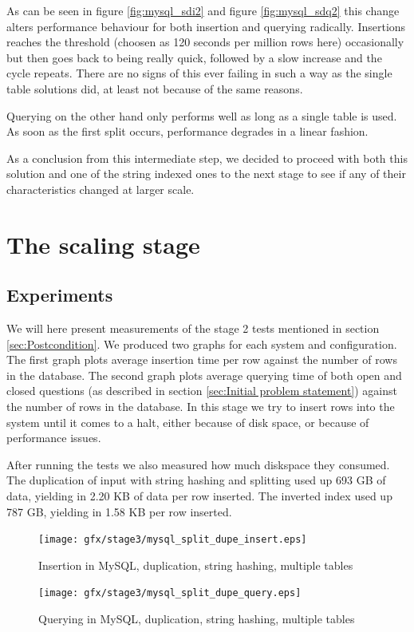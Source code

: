 As can be seen in figure \ref{fig:mysql_sdi2} and figure \ref{fig:mysql_sdq2} this change alters performance behaviour for both insertion and querying radically. Insertions reaches the threshold (choosen as 120 seconds per million rows here) occasionally but then goes back to being really quick, followed by a slow increase and the cycle repeats. There are no signs of this ever failing in such a way as the single table solutions did, at least not because of the same reasons.

Querying on the other hand only performs well as long as a single table is used. As soon as the first split occurs, performance degrades in a linear fashion.

As a conclusion from this intermediate step, we decided to proceed with both this solution and one of the string indexed ones to the next stage to see if any of their characteristics changed at larger scale.

\section{The scaling stage}
\subsection{Experiments} \label{subsec:Experiments3}
We will here present measurements of the stage 2 tests mentioned in section \ref{sec:Postcondition}. We produced two graphs for each system and configuration. The first graph plots average insertion time per row against the number of rows in the database. The second graph plots average querying time of both open and closed questions (as described in section \ref{sec:Initial problem statement}) against the number of rows in the database. In this stage we try to insert rows into the system until it comes to a halt, either because of disk space, or because of performance issues.

After running the tests we also measured how much diskspace they consumed. The duplication of input with string hashing and splitting used up 693 GB of data, yielding in 2.20 KB of data per row inserted. The inverted index used up 787 GB, yielding in 1.58 KB per row inserted.

\pagebreak

\begin{figure}
    \centering
    \texttt{[image: gfx/stage3/mysql\_split\_dupe\_insert.eps]}
    \caption{Insertion in MySQL, duplication, string hashing, multiple tables}
    \label{fig:mysql_sdi3}
\end{figure}
\begin{figure} 
    \centering
    \texttt{[image: gfx/stage3/mysql\_split\_dupe\_query.eps]}
    \caption{Querying in MySQL, duplication, string hashing, multiple tables}
    \label{fig:mysql_sdq3}
\end{figure}
\clearpage

